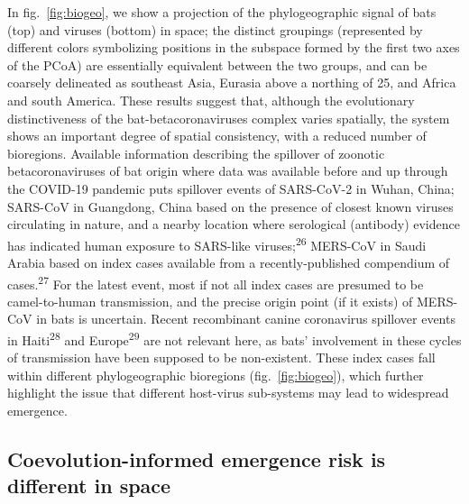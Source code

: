 \documentclass[11pt]{article}
\begin{document}
In fig.~\ref{fig:biogeo}, we show a projection of the phylogeographic
signal of bats (top) and viruses (bottom) in space; the distinct
groupings (represented by different colors symbolizing positions in the
subspace formed by the first two axes of the PCoA) are essentially
equivalent between the two groups, and can be coarsely delineated as
southeast Asia, Eurasia above a northing of 25, and Africa and south
America. These results suggest that, although the evolutionary
distinctiveness of the bat-betacoronaviruses complex varies spatially,
the system shows an important degree of spatial consistency, with a
reduced number of bioregions. Available information describing the
spillover of zoonotic betacoronaviruses of bat origin where data was
available before and up through the COVID-19 pandemic puts spillover
events of SARS-CoV-2 in Wuhan, China; SARS-CoV in Guangdong, China based
on the presence of closest known viruses circulating in nature, and a
nearby location where serological (antibody) evidence has indicated
human exposure to SARS-like viruses;\textsuperscript{26} MERS-CoV in
Saudi Arabia based on index cases available from a recently-published
compendium of cases.\textsuperscript{27} For the latest event, most if
not all index cases are presumed to be camel-to-human transmission, and
the precise origin point (if it exists) of MERS-CoV in bats is
uncertain. Recent recombinant canine coronavirus spillover events in
Haiti\textsuperscript{28} and Europe\textsuperscript{29} are not
relevant here, as bats' involvement in these cycles of transmission have
been supposed to be non-existent. These index cases fall within
different phylogeographic bioregions (fig.~\ref{fig:biogeo}), which
further highlight the issue that different host-virus sub-systems may
lead to widespread emergence.

\hypertarget{coevolution-informed-emergence-risk-is-different-in-space}{%
\subsection{Coevolution-informed emergence risk is different in
space}\label{coevolution-informed-emergence-risk-is-different-in-space}}
\end{document}
